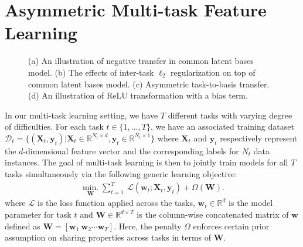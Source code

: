 \documentclass{article}
\newcommand{\vct}[1]{\boldsymbol{#1}} %
\newcommand{\mat}[1]{\boldsymbol{#1}} %
\begin{document}
	\section{Asymmetric Multi-task Feature Learning}
	\begin{figure*}
		\begin{center}
			\hfill
			\hfill
			\hfill
			\hfill
			\hfill
			\vspace{-0.1in}
			\caption{\small (a) An illustration of negative transfer in common latent bases model. (b) The effects of inter-task $\ell_2$ regularization on top of common latent bases model. (c) Asymmetric task-to-basis transfer. (d) An illustration of ReLU transformation with a bias term.}
		\end{center}
		\vspace{-0.15in}
	\end{figure*} 
	
	In our multi-task learning setting, we have $T$ different tasks with varying degree of difficulties. For each task $t\in\{1,\dots,T\}$, we have an associated training dataset $\mathcal{D}_t=\{(\mat{X}_t,\vct{y}_t) | \mat{X}_t \in \mathbb{R}^{N_t \times d}, \vct{y}_t \in \mathbb{R}^{N_t \times 1}\}$ where $\mat{X}_t$ and $\vct{y}_t$ respectively represent the $d$-dimensional feature vector and the corresponding labels for $N_t$ data instances. The goal of multi-task learning is then to jointly train models for all $T$ tasks simultaneously via the following generic learning objective:
	\begin{equation}
	\begin{aligned}
	\operatorname*{min.}_{\mat{W}} \sum_{t=1}^T \ \mathcal{L}(\vct{w}_t; \mat{X}_t, \vct{y}_t) + \Omega(\mat{W}).\label{eq:base_mtl}
	\end{aligned}
	\end{equation}
	where $\mathcal{L}$ is the loss function applied across the tasks, $\vct{w}_t \in \mathbb{R}^{d}$ is the model parameter for task $t$ and $\mat{W} \in \mathbb{R}^{d\times T}$ is the column-wise concatenated matrix of $\vct{w}$ defined as $\mat{W} = [\vct{w}_1\ \vct{w}_2 \cdots \vct{w}_T]$. Here, the penalty $\Omega$ enforces certain prior assumption on sharing properties across tasks in terms of $\mat{W}$. 
	
\end{document}

